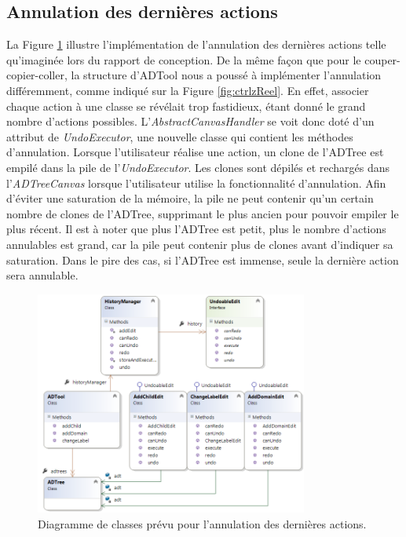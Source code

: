 	\subsection{Annulation des dernières actions}
		 La {\sc Figure} \ref{fig:ctrlzPrevu} illustre l'implémentation de l'annulation des dernières actions telle qu'imaginée lors du rapport de conception. De la même façon que pour le couper-copier-coller, la structure d'ADTool nous a poussé à implémenter l'annulation différemment, comme indiqué sur la {\sc Figure} \ref{fig:ctrlzReel}. En effet, associer chaque action à une classe se révélait trop fastidieux, étant donné le grand nombre d'actions possibles. L'\emph{AbstractCanvasHandler} se voit donc doté d'un attribut de \emph{UndoExecutor}, une nouvelle classe qui contient les méthodes d'annulation. Lorsque l'utilisateur réalise une action, un clone de l'ADTree est empilé dans la pile de l'\emph{UndoExecutor}. Les clones sont dépilés et rechargés dans l'\emph{ADTreeCanvas} lorsque l'utilisateur utilise la fonctionnalité d'annulation. Afin d'éviter une saturation de la mémoire, la pile ne peut contenir qu'un certain nombre de clones de l'ADTree, supprimant le plus ancien pour pouvoir empiler le plus récent. Il est à noter que plus l'ADTree est petit, plus le nombre d'actions annulables est grand, car la pile peut contenir plus de clones avant d'indiquer sa saturation. Dans le pire des cas, si l'ADTree est immense, seule la dernière action sera annulable. 
		 
        \begin{figure}
            \centering
                \includegraphics[width=0.8\textwidth]{figure/ctrlz.png}
            \caption{Diagramme de classes prévu pour l'annulation des dernières actions.}
            \label{fig:ctrlzPrevu}
        \end{figure}
        
